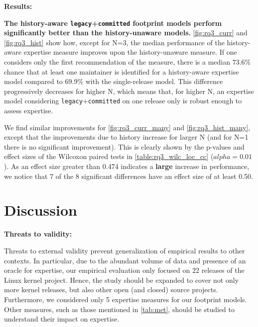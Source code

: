 {\bf Results:}

\textbf{The history-aware \texttt{legacy}+\texttt{committed} footprint models perform significantly better than the history-unaware models.} \autoref{fig:rq3_curr} and \autoref{fig:rq3_hist} show how, except for N=3, the median performance of the history-aware expertise measure improves upon the history-unaware measure. If one considers only the first recommendation of the measure, there is a median 73.6\% chance that at least one maintainer is identified for a history-aware expertise model compared to 69.9\% with the single-release model. This difference progressively decreases for higher N, which means that, for higher N, an expertise model considering \texttt{legacy}+\texttt{committed} on one release only is robust enough to assess expertise.

We find similar improvements for \autoref{fig:rq3_curr_many} and \autoref{fig:rq3_hist_many}, except that the improvements due to history increase for larger N (and for N=1 there is no significant improvement). This is clearly shown %
by the p-values and effect sizes of the Wilcoxon paired tests in \autoref{table:rq3_wilc_loc_cc} ($alpha=0.01$). As an effect size greater than 0.474 indicates a \textbf{large} increase in performance, we notice that 7 of the 8 significant differences have an effect size of at least 0.50. %


\section{Discussion}
\label{sec:discussion}

\textbf{Threats to validity:}

Threats to external validity prevent generalization of empirical results to other contexts. In particular, due to the abundant volume of data and presence of an oracle for expertise, our empirical evaluation only focused on 22 releases of the Linux kernel project. Hence, the study should be expanded to cover not only more kernel releases, but also other open (and closed) source projects. Furthermore, we considered only 5 expertise measures for our footprint models. Other measures, such as those mentioned in \autoref{tab:met}, should be studied to understand their impact on expertise.

